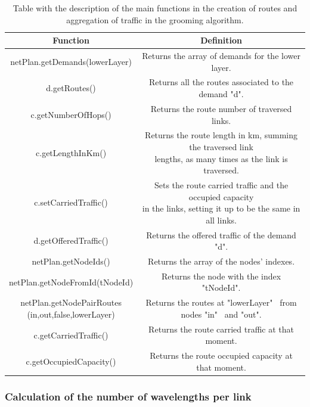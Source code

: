 \begin{table}[H]
\centering
\begin{tabular}{|| c | c ||}
 \hline
 Function & Definition \\
 \hline\hline
 netPlan.getDemands(lowerLayer) & Returns the array of demands for the lower layer. \\
 \hline
 d.getRoutes() & Returns all the routes associated to the demand "d". \\
 \hline
 c.getNumberOfHops() & Returns the route number of traversed links. \\
 \hline
 c.getLengthInKm() & \makecell{Returns the route length in km, summing the traversed link\\lengths, as many times as the link is traversed.} \\
 \hline
 c.setCarriedTraffic() & \makecell{Sets the route carried traffic and the occupied capacity\\in the links, setting it up to be the same in all links.} \\
 \hline
 d.getOfferedTraffic() & Returns the offered traffic of the demand "d". \\
 \hline
 netPlan.getNodeIds() & Returns the array of the nodes' indexes. \\
 \hline
 netPlan.getNodeFromId(tNodeId) & Returns the node with the index "tNodeId". \\
 \hline
 \makecell{netPlan.getNodePairRoutes\\(in,out,false,lowerLayer)} & Returns the routes at "lowerLayer" \ from nodes "in" \ and "out". \\
 \hline
 c.getCarriedTraffic() & Returns the route carried traffic at that moment. \\
 \hline
 c.getOccupiedCapacity() & Returns the route occupied capacity at that moment. \\
 \hline
\end{tabular}
\caption{Table with the description of the main functions in the creation of routes and aggregation of traffic in the grooming algorithm.}
\label{grooming_table_variables_translucent}
\end{table}

\subsubsection{Calculation of the number of wavelengths per link}

